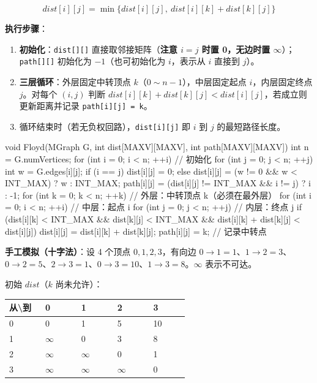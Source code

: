 \documentclass[11pt,openany,UTF8]{ctexbook}
\begin{document}
\[dist[i][j]=\min\{dist[i][j],\ dist[i][k]+dist[k][j]\}\]

\textbf{执行步骤}：

\begin{enumerate}
\item \textbf{初始化}：\texttt{dist[]\allowbreak{}[]\allowbreak{}} 直接取邻接矩阵（\textbf{注意 $i=j$ 时置 0，无边时置 $\infty$}）；\texttt{path[]\allowbreak{}[]\allowbreak{}} 初始化为 $-1$（也可初始化为 $i$，表示从 $i$ 直接到 $j$）。
\item \textbf{三层循环}：外层固定中转顶点 $k$（$0\sim n-1$），中层固定起点 $i$，内层固定终点 $j$。对每个 $(i,j)$ 判断 $dist[i][k]+dist[k][j]<dist[i][j]$，若成立则更新距离并记录 \texttt{path[i]\allowbreak{}[j]\allowbreak{} =\allowbreak{} k}。
\item 循环结束时（若无负权回路），\texttt{dist[i]\allowbreak{}[j]\allowbreak{}} 即 $i$ 到 $j$ 的最短路径长度。
\end{enumerate}
\begin{codebox}
void Floyd(MGraph G, int dist[MAXV][MAXV], int path[MAXV][MAXV]) {
    int n = G.numVertices;
    for (int i = 0; i < n; ++i) {                     // 初始化
        for (int j = 0; j < n; ++j) {
            int w = G.edges[i][j];
            if (i == j) dist[i][j] = 0;
            else dist[i][j] = (w != 0 && w < INT_MAX) ? w : INT_MAX;
            path[i][j] = (dist[i][j] != INT_MAX && i != j) ? i : -1;
        }
    }
    for (int k = 0; k < n; ++k) {                     // 外层：中转顶点 k（必须在最外层）
        for (int i = 0; i < n; ++i) {                 // 中层：起点 i
            for (int j = 0; j < n; ++j) {             // 内层：终点 j
                if (dist[i][k] < INT_MAX && dist[k][j] < INT_MAX
                    && dist[i][k] + dist[k][j] < dist[i][j]) {
                    dist[i][j] = dist[i][k] + dist[k][j];
                    path[i][j] = k;                   // 记录中转点
                }
            }
        }
    }
}
\end{codebox}

\textbf{手工模拟（十字法）}：设 4 个顶点 $0,1,2,3$，有向边 $0\to 1=1$、$1\to 2=3$、$0\to 2=5$、$2\to 3=1$、$0\to 3=10$、$1\to 3=8$。$\infty$ 表示不可达。

初始 $dist$（$k$ 尚未允许）：

\begingroup\small\setlength{\tabcolsep}{4.0pt}
\begin{longtable}{@{}L{0.1788\linewidth}L{0.1788\linewidth}L{0.1788\linewidth}L{0.1788\linewidth}L{0.1788\linewidth}@{}}
\toprule
\textbf{从\textbackslash{}到} & \textbf{0} & \textbf{1} & \textbf{2} & \textbf{3} \\
\midrule
{} & 0 & 1 & 5 & 10 \\
1 & $\infty$ & 0 & 3 & 8 \\
2 & $\infty$ & $\infty$ & 0 & 1 \\
3 & $\infty$ & $\infty$ & $\infty$ & 0 \\
\bottomrule
\end{longtable}
\endgroup
\end{document}
